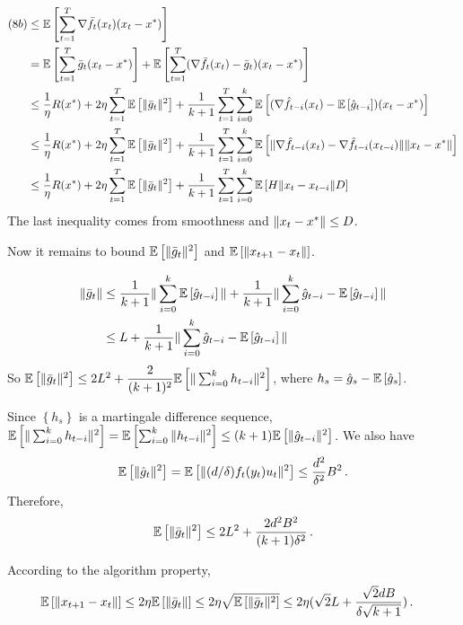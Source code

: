 \documentclass[11pt,letterpaper,english]{article}
\begin{document}
\begin{align*}
(8b) 
&\leq  \mathbb{E}\left[\sum_{t=1}^T \nabla \bar{f}_t (x_t) (x_t-x^*)\right]\\
& = \mathbb{E}\left[\sum_{t=1}^T \bar{g}_t (x_t - x^*)\right] + \mathbb{E}\left[\sum_{t=1}^T (\nabla \bar{f}_t (x_t) -\bar{g}_t) (x_t-x^*)\right]\\
&\leq \dfrac{1}{\eta} R(x^*) + 2\eta \sum_{t=1}^T\mathbb{E}\left[ \|\bar{g}_t\|^2\right] + \dfrac{1}{k+1} \sum_{t=1}^{T}\sum_{i=0}^k \mathbb{E}\left[ (\nabla \hat{f}_{t-i}(x_t) - \mathbb{E}\left[\hat{g}_{t-i}\right]) (x_t-x^*) \right] \\
&\leq \dfrac{1}{\eta} R(x^*) + 2\eta \sum_{t=1}^T\mathbb{E}\left[ \|\bar{g}_t\|^2\right] + \dfrac{1}{k+1} \sum_{t=1}^{T}\sum_{i=0}^k \mathbb{E}\left[ \|\nabla \hat{f}_{t-i}(x_t) - \nabla \hat{f}_{t-i}(x_{t-i})\| \|x_t-x^*\| \right]\\
& \leq \dfrac{1}{\eta} R(x^*) + 2\eta \sum_{t=1}^T\mathbb{E}\left[ \|\bar{g}_t\|^2\right] + \dfrac{1}{k+1} \sum_{t=1}^{T}\sum_{i=0}^k \mathbb{E}\left[H \|x_t-x_{t-i}\| D \right]
\end{align*}
The last inequality comes from smoothness and $\|x_t - x^*\| \leq D$.

Now it remains to bound $\mathbb{E}\left[ \|\bar{g}_t\|^2\right]$ and $\mathbb{E}\left[\|x_{t+1}-x_t\|\right]$.

\begin{align*}
\|\bar{g}_t\| &\leq \dfrac{1}{k+1} \| \sum_{i=0}^k \mathbb{E}\left[\hat{g}_{t-i}\right]  \| + \dfrac{1}{k+1} \| \sum_{i=0}^k \hat{g}_{t-i} - \mathbb{E}\left[\hat{g}_{t-i}\right]  \| \\
&\leq L + \dfrac{1}{k+1} \| \sum_{i=0}^k \hat{g}_{t-i} - \mathbb{E}\left[\hat{g}_{t-i}\right]  \|
\end{align*}
So 
$\mathbb{E}\left[\|\bar{g}_t\|^2\right] \leq 2L^2+\dfrac{2}{(k+1)^2} \mathbb{E}\left[\| \sum_{i=0}^k h_{t-i}  \|^2\right]$, where $h_s = \hat{g}_s-\mathbb{E}\left[\hat{g}_s\right]$.

Since $\left\lbrace h_s \right\rbrace$ is a martingale difference sequence, 
$\mathbb{E}\left[\| \sum_{i=0}^k h_{t-i}  \|^2\right] = \mathbb{E}\left[\sum_{i=0}^k \|h_{t-i}\|^2  \right] \leq  (k+1)\mathbb{E}\left[\|\hat{g}_{t-i}\|^2\right] $. We also have
\begin{align*}
\mathbb{E}\left[\|\hat{g}_{t}\|^2\right]  = \mathbb{E}\left[ \|(d/\delta) f_t(y_t) u_t\|^2 \right]
\leq \dfrac{d^2}{\delta^2} B^2 \,.
\end{align*}
Therefore,
\begin{align*}
\mathbb{E}\left[\|\bar{g}_t\|^2\right] \leq 2L^2+ \dfrac{2d^2B^2}{(k+1)\delta^2}\,.
\end{align*}

According to the algorithm property,
\begin{align*}
\mathbb{E}\left[\|x_{t+1}-x_t\|\right] &\leq 2\eta \mathbb{E}\left[\|\bar{g}_t\|\right]
\leq 2\eta \sqrt{\mathbb{E}\left[\|\bar{g}_t\|^2\right]}
\leq 2\eta ( \sqrt{2}L+\dfrac{\sqrt{2}dB}{\delta\sqrt{k+1}} ) \,.
\end{align*}
\end{document}
